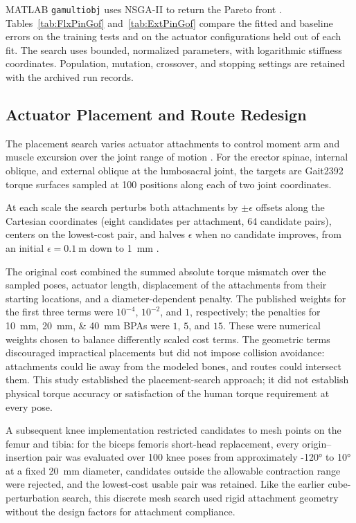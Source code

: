 MATLAB \texttt{gamultiobj} uses NSGA-II to return the Pareto front \citep{deb_nsga2_2002, mathworks_optimization_2025}. Tables~\ref{tab:FlxPinGof} and~\ref{tab:ExtPinGof} compare the fitted and baseline errors on the training tests and on the actuator configurations held out of each fit. The search uses bounded, normalized parameters, with logarithmic stiffness coordinates. Population, mutation, crossover, and stopping settings are retained with the archived run records.

\subsection{Actuator Placement and Route Redesign}\label{sec:mesh_opt}\label{sec:optimization}

The placement search varies actuator attachments to control moment arm and muscle excursion over the joint range of motion \citep{bolen_determination_2019,morrow_optimization_2020}. For the erector spinae, internal oblique, and external oblique at the lumbosacral joint, the targets are Gait2392 torque surfaces sampled at 100 positions along each of two joint coordinates.

At each scale the search perturbs both attachments by $\pm\epsilon$ offsets along the Cartesian coordinates (eight candidates per attachment, 64 candidate pairs), centers on the lowest-cost pair, and halves $\epsilon$ when no candidate improves, from an initial $\epsilon=\qty{0.1}{\m}$ down to \qty{1}{\mm} \citep{morrow_optimization_2020}.

The original cost combined the summed absolute torque mismatch over the sampled poses, actuator length, displacement of the attachments from their starting locations, and a diameter-dependent penalty. The published weights for the first three terms were $10^{-4}$, $10^{-2}$, and $1$, respectively; the penalties for \qtylist{10;20;40}{\mm} BPAs were $1$, $5$, and $15$. These were numerical weights chosen to balance differently scaled cost terms. The geometric terms discouraged impractical placements but did not impose collision avoidance: attachments could lie away from the modeled bones, and routes could intersect them. This study established the placement-search approach; it did not establish physical torque accuracy or satisfaction of the human torque requirement at every pose.

A subsequent knee implementation restricted candidates to mesh points on the femur and tibia: for the biceps femoris short-head replacement, every origin--insertion pair was evaluated over 100 knee poses from approximately \ang{-120} to \ang{10} at a fixed \qty{20}{\mm} diameter, candidates outside the allowable contraction range were rejected, and the lowest-cost usable pair was retained. Like the earlier cube-perturbation search, this discrete mesh search used rigid attachment geometry without the design factors for attachment compliance.

